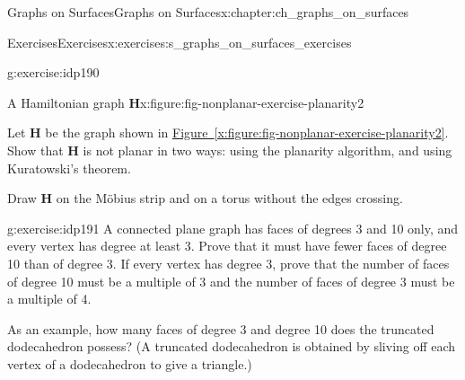 \documentclass[oneside,10pt,]{book}
\newcommand{\xreffont}{\relax}
\numberwithin{equation}{section}
\newcommand{\bfH}{\mathbf{H}}
\begin{document}
\begin{chapterptx}{Graphs on Surfaces}{}{Graphs on Surfaces}{}{}{x:chapter:ch_graphs_on_surfaces}
\begin{exercises-section}{Exercises}{}{Exercises}{}{}{x:exercises:s_graphs_on_surfaces_exercises}
\begin{divisionexercise}{4}{}{}{g:exercise:idp190}
\begin{figureptx}{A Hamiltonian graph \(\bfH\)}{x:figure:fig-nonplanar-exercise-planarity2}{}
\begin{image}{0.15}{0.7}{0.15}
{
}%
\end{image}%
\tcblower
\end{figureptx}%
Let \(\bfH\) be the graph shown in \hyperref[x:figure:fig-nonplanar-exercise-planarity2]{Figure~{\xreffont\ref{x:figure:fig-nonplanar-exercise-planarity2}}}.  Show that \(\bfH\) is not planar in two ways: using the planarity algorithm, and using Kuratowski's theorem.%
\par
Draw \(\bfH\) on the Möbius strip and on a torus without the edges crossing.%
\end{divisionexercise}%
\begin{divisionexercise}{5}{}{}{g:exercise:idp191}%
A connected plane graph has faces of degrees 3 and 10 only, and every vertex has degree at least 3.  Prove that it must have fewer faces of degree 10 than of degree 3.  If every vertex has degree 3, prove that the number of faces of degree 10 must be a multiple of 3 and the number of faces of degree 3 must be a multiple of 4.%
\par
As an example, how many faces of degree 3 and degree 10 does the truncated dodecahedron possess?  (A truncated dodecahedron is obtained by sliving off each vertex of a dodecahedron to give a triangle.)%
\end{divisionexercise}%
\end{exercises-section}
\end{chapterptx}
%
%
\typeout{************************************************}
\typeout{************************************************}
%
\end{document}

